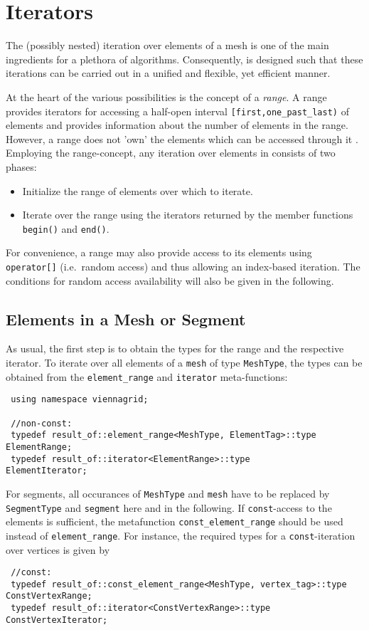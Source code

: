 \chapter{Iterators} \label{chap:iterators}

The (possibly nested) iteration over elements of a mesh is one of the main ingredients for a plethora of algorithms.
Consequently, {\ViennaGrid} is designed such that these iterations can be carried out in a unified and flexible, yet efficient manner.

At the heart of the various possibilities is the concept of a \emph{range}. A range provides iterators for accessing a half-open interval \texttt{[first,one\_past\_last)} of elements and provides information about the number of elements in the range. However, a range does not 'own' the elements which can be accessed through it \cite{boost}.
Employing the range-concept, any iteration over elements in {\ViennaGrid} consists of two phases:
\begin{itemize}
 \item Initialize the range of elements over which to iterate.
 \item Iterate over the range using the iterators returned by the member functions \lstinline|begin()| and \lstinline|end()|.
\end{itemize}

For convenience, a range may also provide access to its elements using \lstinline|operator[]| (i.e.~random access) and thus allowing an index-based iteration. The conditions for random access availability will also be given in the following.


\section{Elements in a Mesh or Segment}
As usual, the first step is to obtain the types for the range and the respective iterator.
To iterate over all elements of a \lstinline|mesh| of type \lstinline|MeshType|, the types can be obtained from the \lstinline|element_range| and \lstinline|iterator| meta-functions:
\begin{lstlisting}
 using namespace viennagrid;

 //non-const:
 typedef result_of::element_range<MeshType, ElementTag>::type ElementRange;
 typedef result_of::iterator<ElementRange>::type           ElementIterator;
\end{lstlisting}
For segments, all occurances of \lstinline|MeshType| and \lstinline|mesh| have to be replaced by \lstinline|SegmentType| and \lstinline|segment| here and in the following.
If \lstinline|const|-access to the elements is sufficient, the metafunction \lstinline|const_element_range| should be used instead of \lstinline|element_range|.
For instance, the required types for a \lstinline|const|-iteration over vertices is given by
\begin{lstlisting}
 //const:
 typedef result_of::const_element_range<MeshType, vertex_tag>::type   ConstVertexRange;
 typedef result_of::iterator<ConstVertexRange>::type         ConstVertexIterator;
\end{lstlisting}

